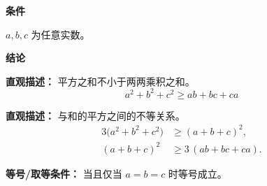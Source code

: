 \begin{statementbox}

\textbf{\textcolor{CStatement}{条件}}
\begin{description}[style=nextline, leftmargin=2.8em, labelsep=0.5em, itemsep=0.35em]
    \item[\textbf{\textcolor{CStatement}{条件 1（任意实数）：}}] $a, b, c$ 为任意实数。
\end{description}

\textbf{\textcolor{CStatement}{结论}}
\begin{description}[style=nextline, leftmargin=2.8em, labelsep=0.5em, itemsep=0.45em]
    \item[\textbf{\textcolor{CStatement}{结论一（平方和与积和）：}}]
    \textbf{\textcolor{CStatement}{直观描述：}} 平方之和不小于两两乘积之和。
    \[
    a^{2} + b^{2} + c^{2} \geq ab + bc + ca
    \]

    \item[\textbf{\textcolor{CStatement}{推广结论（等价变形）：}}]
    \textbf{\textcolor{CStatement}{直观描述：}} 与和的平方之间的不等关系。
    \[
    \begin{aligned}
       3\bigl(a^{2} + b^{2} + c^{2}\bigr) &\geq (a+b+c)^{2}, \\
       (a+b+c)^{2} &\geq 3\,(ab+bc+ca).
    \end{aligned}
    \]
\end{description}

\textbf{\textcolor{CStatement}{等号/取等条件：}} 当且仅当 $a = b = c$ 时等号成立。

\end{statementbox}
